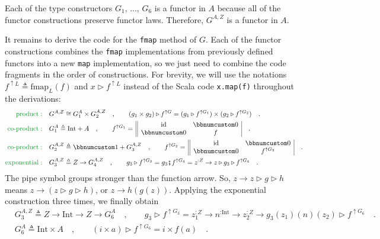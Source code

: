 Each of the type constructors $G_{1}$, ..., $G_{6}$ is a functor
in $A$ because all of the functor constructions preserve functor
laws. Therefore, $G^{A,Z}$ is a functor in $A$. 

It remains to derive the code for the \lstinline!fmap! method of
$G$. Each of the functor constructions combines the \lstinline!fmap!
implementations from previously defined functors into a new \lstinline!map!
implementation, so we just need to combine the code fragments in the
order of constructions. For brevity, we will use the notations $f^{\uparrow L}\triangleq\text{fmap}_{L}(f)$
and $x\triangleright f^{\uparrow L}$ instead of the Scala code \lstinline!x.map(f)!
throughout the derivations:
\begin{align*}
{\color{greenunder}\text{product}:}\quad & G^{A,Z}\cong G_{1}^{A}\times G_{2}^{A,Z}\quad,\quad\quad(g_{1}\times g_{2})\triangleright f^{\uparrow G}=(g_{1}\triangleright f^{\uparrow G_{1}})\times(g_{2}\triangleright f^{\uparrow G_{2}})\quad.\\
{\color{greenunder}\text{co-product}:}\quad & G_{1}^{A}\triangleq\text{Int}+A\quad,\quad\quad f^{\uparrow G_{1}}=\,\begin{array}{||cc|}
\text{id} & \bbnum 0\\
\bbnum 0 & f
\end{array}\quad.\\
{\color{greenunder}\text{co-product}:}\quad & G_{2}^{A,Z}\triangleq\bbnum 1+G_{3}^{A,Z}\quad,\quad\quad f^{\uparrow G_{2}}=\,\begin{array}{||cc|}
\text{id} & \bbnum 0\\
\bbnum 0 & f^{\uparrow G_{3}}
\end{array}\quad.\\
{\color{greenunder}\text{exponential}:}\quad & G_{3}^{A,Z}\triangleq Z\rightarrow G_{4}^{A,Z}\quad,\quad\quad g_{3}\triangleright f^{\uparrow G_{3}}=g_{3}\bef f^{\uparrow G_{4}}=z^{:Z}\rightarrow z\triangleright g_{3}\triangleright f^{\uparrow G_{4}}\quad.
\end{align*}
The pipe symbol groups stronger than the function arrow.
So, $z\rightarrow z\triangleright g\triangleright h$ means $z\rightarrow(z\triangleright g\triangleright h)$,
or $z\rightarrow h(g(z))$. Applying the exponential  construction
three times, we finally obtain
\begin{align*}
 & G_{3}^{A,Z}\triangleq Z\rightarrow\text{Int}\rightarrow Z\rightarrow G_{6}^{A}\quad,\quad\quad g_{3}\triangleright f^{\uparrow G_{3}}=z_{1}^{:Z}\rightarrow n^{:\text{Int}}\rightarrow z_{2}^{:Z}\rightarrow g_{3}(z_{1})(n)(z_{2})\triangleright f^{\uparrow G_{6}}\quad.\\
 & G_{6}^{A}\triangleq\text{Int}\times A\quad,\quad\quad(i\times a)\triangleright f^{\uparrow G_{6}}=i\times f(a)\quad.
\end{align*}
